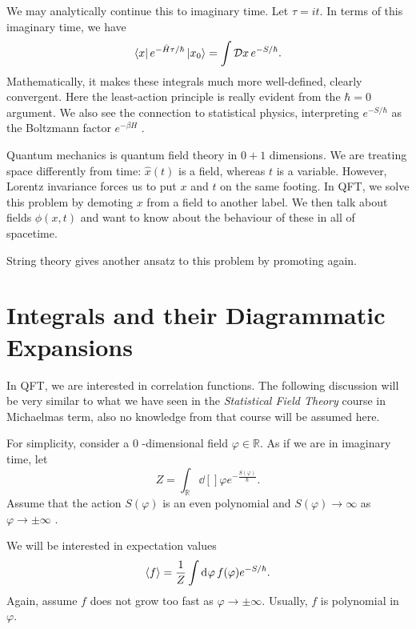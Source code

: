 
We may analytically continue this to imaginary time.
Let $\tau = i t$. In terms of this imaginary time, we have
 \begin{equation}
  \bra{x} e^{- \hat{H} \tau / \hbar} \ket{x_0} = \int \mathop{\mathcal{D} x} e^{-S / \hbar}.
\end{equation}
Mathematically, it makes these integrals much more well-defined, clearly convergent.
Here the least-action principle is really evident from  the $\hbar = 0$ argument.
We also see the connection to statistical physics, interpreting  $e^{-S / \hbar}$  as the Boltzmann factor $e^{-\beta H}$ .

Quantum mechanics is quantum field theory in $0 + 1$  dimensions.
We are treating space differently from time: $\hat{x}(t)$  is a field, whereas $t$  is a variable.
However, Lorentz invariance forces us to put $x$  and $t$  on the same footing.
In QFT, we solve this problem by demoting $x$  from a field to another label. We then talk about fields $\phi(x, t)$ and want to know about the behaviour of these in all of spacetime.
\begin{leftbar}
  String theory gives another ansatz to this problem by promoting again.
\end{leftbar}

\chapter{Integrals and their Diagrammatic Expansions}%
\label{cha:integrals_and_their_diagrammatic_expansions}

In QFT, we are interested in correlation functions.
The following discussion will be very similar to what we have seen in the \emph{Statistical Field Theory} course in Michaelmas term, also no knowledge from that course will be assumed here.

For simplicity, consider a $0$ -dimensional field $\varphi \in \mathbb{R}$. As if we are in imaginary time, let
\begin{equation}
  Z = \int_{\mathbb{R}} \dd[]{\varphi} e^{- \frac{S(\varphi)}{\hbar}}.
\end{equation} 
Assume that the action $S(\varphi)$  is an even polynomial and  $S(\varphi) \to \infty$  as $\varphi \to \pm \infty$ .

We will be interested in expectation values
\begin{equation}
  \expectationvalue{f} = \frac{1}{Z} \int \dd[]{\varphi} f(\varphi) e^{-S / \hbar}.
\end{equation}
Again, assume $f$ does not grow too fast as $\varphi \to \pm \infty$. Usually, $f$ is polynomial in $\varphi$.

